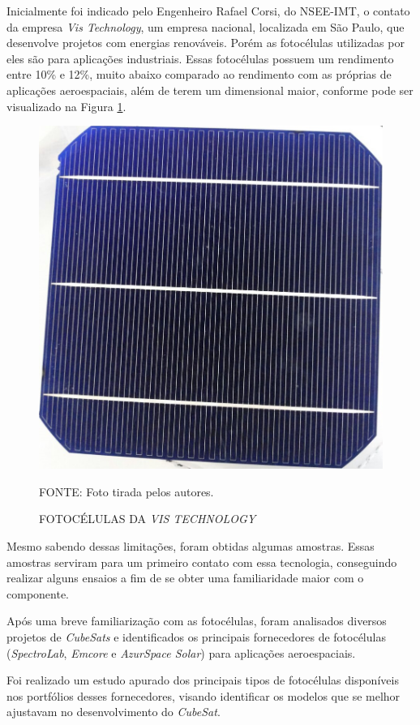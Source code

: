 \documentclass[
	12pt,				%
	openright,			%
	oneside,			%
	a4paper,			%
	english,			%
	french,				%
	spanish,			%
	brazil,				%
	oldfontcommands
	]{abntex2}
\begin{document}
	Inicialmente foi indicado pelo Engenheiro Rafael Corsi, do NSEE-IMT, o contato da empresa \textit{Vis Technology}, um empresa nacional, localizada em São Paulo, que desenvolve projetos com energias renováveis. Porém as fotocélulas utilizadas por eles são para aplicações industriais. Essas fotocélulas possuem um rendimento entre 10\% e 12\%, muito abaixo comparado ao rendimento com as próprias de aplicações aeroespaciais, além de terem um dimensional maior, conforme pode ser visualizado na Figura \ref{Fig_Cell_Vis}.
	
	\begin{figure}[th]
		\caption{FOTOCÉLULAS DA \textit{VIS TECHNOLOGY}}
		\label{Fig_Cell_Vis}
		\centering
		\includegraphics[width=0.6\linewidth]{./figs/cell_vis}
			
		\begin{small}
			FONTE: Foto tirada pelos autores.
		\end{small}		
	\end{figure}
	
	Mesmo sabendo dessas limitações, foram obtidas algumas amostras. Essas amostras serviram para um primeiro contato com essa tecnologia, conseguindo realizar alguns ensaios a fim de se obter uma familiaridade maior com o componente.
	
	Após uma breve familiarização com as fotocélulas, foram analisados diversos projetos de \textit{CubeSats} e identificados os principais fornecedores de fotocélulas (\textit{SpectroLab}, \textit{Emcore} e \textit{AzurSpace Solar}) para aplicações aeroespaciais.
	
	Foi realizado um estudo apurado dos principais tipos de fotocélulas disponíveis nos portfólios desses fornecedores, visando identificar os modelos que se melhor ajustavam no desenvolvimento do \textit{CubeSat}.
	
\end{document}
